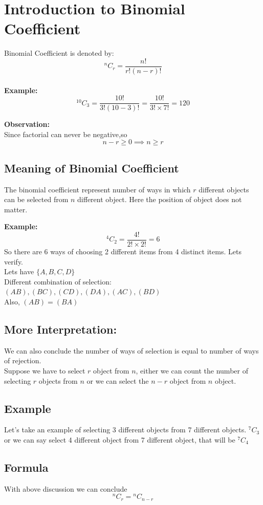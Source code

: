 \section{Introduction to Binomial Coefficient}
Binomial Coefficient is denoted by: \[
\boxed{{}^{n}C_{r} = \frac{n!}{r!(n-r)!}}
\]\\
\textbf{Example: }\\
\[
{}^{10}C_{3} = \frac{10!}{3!(10-3)!} = \frac{10!}{3! \times 7!} = 120
\]

\textbf{Observation: }\\
Since factorial can never be negative,so\\
\[
n-r \geq 0 \implies n \geq r 
\]

\subsection{Meaning of Binomial Coefficient}
The binomial coefficient represent number of ways in which $r$ different objects can be selected from $n$ different object. Here the position of object does not matter.

\textbf{Example: }\\
\[
{}^{4}C_{2} = \frac{4!}{2! \times2!} = 6
\]
So there are 6 ways of choosing 2 different items from 4 distinct items. Lets verify.\\
Lets have $\{A,B,C,D\}$\\
Different combination of selection:
$(AB), (BC), (CD), (DA), (AC), (BD)$\\
Also, $(AB)=(BA)$

\subsection{More Interpretation: }
We can also conclude the number of ways of selection is equal to number of ways of rejection. \\
Suppose we have to select $r$ object from $n$, either we can count the number of selecting $r$ objects from $n$ or we can select the $n-r$ object from $n$ object.
\subsection{Example}
Let's take an example of selecting 3 different objects from 7 different objects. ${}^{7}C_{3}$\\
or we can say select 4 different object from 7 different object, that will be ${}^{7}C_{4}$

\subsection{Formula}
With above discussion we can conclude\[
\boxed{{}^{n}C_{r} = {}^{n}C_{n-r}}
\]

